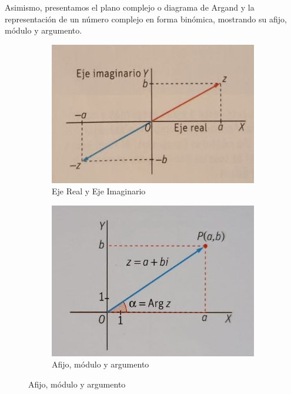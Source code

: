 \documentclass[../main.tex]{memoir}
\begin{document}
Asimismo, presentamos el plano complejo o diagrama de Argand y la representación de un número complejo en forma binómica, mostrando su afijo, módulo y argumento.
\begin{figure}[H]
	\centering
	\begin{subfigure}{0.48\textwidth}
		\centering
		\includegraphics[width=\linewidth]{images/ejes.jpg}
		\caption{Eje Real y Eje Imaginario}
	\end{subfigure}
	\begin{subfigure}{0.48\textwidth}
		\centering
		\includegraphics[width=\linewidth]{images/afijo.jpg}
		\caption{Afijo, módulo y argumento}
	\end{subfigure}
	\label{fig:representacion2}
\end{figure}
\end{document}
